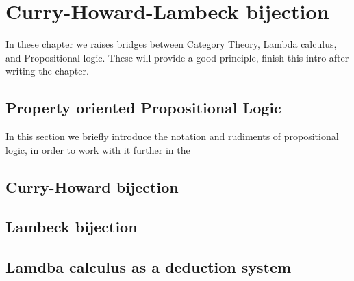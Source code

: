 
\chapter{Curry-Howard-Lambeck bijection}
In these chapter we raises bridges between Category Theory, Lambda calculus, and Propositional logic. These will provide a good principle, {\color{red} finish this intro after writing the chapter}. 


\section{Property oriented Propositional Logic}
In this section we briefly introduce the notation and rudiments of propositional logic, in order to work with it further in the 

\section{Curry-Howard bijection}

\section{Lambeck bijection}

\section{Lamdba calculus as a deduction system}